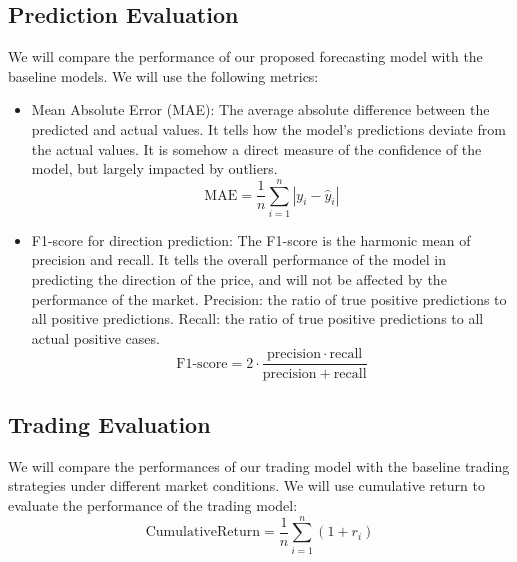 \documentclass[12pt, a4paper]{article}
\begin{document}
\subsection{Prediction Evaluation}
We will compare the performance of our proposed forecasting model with the baseline models. We will use the following metrics:
\begin{itemize}
    \item Mean Absolute Error (MAE):\newline
    The average absolute difference between the predicted and actual values. It tells how the model's predictions deviate from the actual values. It is somehow a direct measure of the confidence of the model, but largely impacted by outliers.
    \[
    \mathrm{MAE} = \frac{1}{n} \sum_{i=1}^{n} |y_i - \hat{y}_i|
    \]

    \item F1-score for direction prediction:\newline
    The F1-score is the harmonic mean of precision and recall. It tells the overall performance of the model in predicting the direction of the price, and will not be affected by the performance of the market.\newline
    Precision: the ratio of true positive predictions to all positive predictions. \newline
    Recall: the ratio of true positive predictions to all actual positive cases.
    \[
    \mathrm{F1\text{-}score} = 2 \cdot \frac{\mathrm{precision}\cdot\mathrm{recall}}{\mathrm{precision}+\mathrm{recall}}
    \]
\end{itemize}

\subsection{Trading Evaluation}
We will compare the performances of our trading model with the baseline trading strategies under different market conditions. We will use cumulative return to evaluate the performance of the trading model:
\[
\mathrm{Cumulative Return} = \frac{1}{n} \sum_{i=1}^{n} (1 + r_i)
\]
\end{document}
